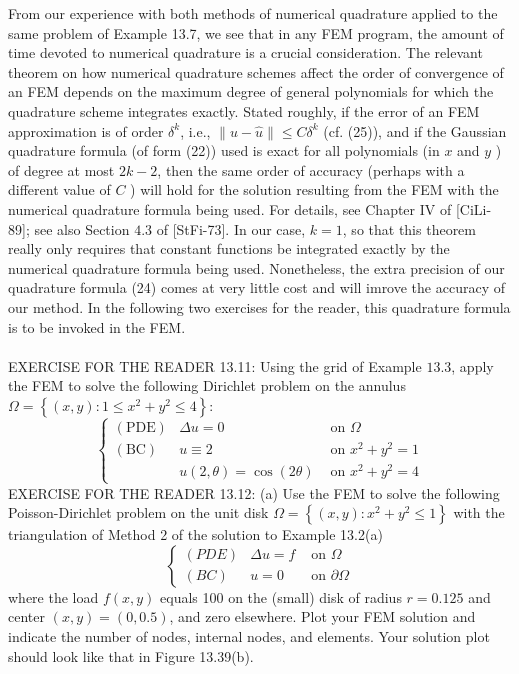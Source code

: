 \documentclass[../main.tex]{subfiles}
\begin{document}
From our experience with both methods of numerical quadrature applied to the same problem of Example 13.7, we see that in any FEM program, the amount of time devoted to numerical quadrature is a crucial consideration. The relevant theorem on how numerical quadrature schemes affect the order of convergence of an FEM depends on the maximum degree of general polynomials for which the quadrature scheme integrates exactly. Stated roughly, if the error of an FEM approximation is of order $\delta^{k}$, i.e., $\|u-\hat{u}\| \leq C \delta^{k}$ (cf. (25)), and if the Gaussian quadrature formula (of form (22)) used is exact for all polynomials (in $x$ and $y$ ) of degree at most $2 k-2$, then the same order of accuracy (perhaps with a different value of $C$ ) will hold for the solution resulting from the FEM with the numerical quadrature formula being used. For details, see Chapter IV of [CiLi-89]; see also Section $4.3$ of [StFi-73]. In our case, $k=1$, so that this theorem really only requires that constant functions be integrated exactly by the numerical quadrature formula being used. Nonetheless, the extra precision of our quadrature formula (24) comes at very little cost and will imrove the accuracy of our method. In the following two exercises for the reader, this quadrature formula is to be invoked in the FEM.
\\
\\
EXERCISE FOR THE READER 13.11: Using the grid of Example $13.3$, apply the FEM to solve the following Dirichlet problem on the annulus $\Omega=\left\{(x, y): 1 \leq x^{2}+y^{2} \leq 4\right\}:$
$$
\left\{\begin{array}{lll}
(\mathrm{PDE}) & \Delta u=0 & \text { on } \Omega \\
(\mathrm{BC}) & u \equiv 2 & \text { on } x^{2}+y^{2}=1 \\
& u(2, \theta)=\cos (2 \theta) & \text { on } x^{2}+y^{2}=4
\end{array}\right.
$$
EXERCISE FOR THE READER 13.12: (a) Use the FEM to solve the following Poisson-Dirichlet problem on the unit disk $\Omega=\left\{(x, y): x^{2}+y^{2} \leq 1\right\}$ with the triangulation of Method 2 of the solution to Example 13.2(a)
$$
\left\{\begin{array}{lll}
(P D E) & \Delta u=f & \text { on } \Omega \\
(B C) & u=0 & \text { on } \partial \Omega
\end{array}\right.
$$
where the load $f(x, y)$ equals 100 on the (small) disk of radius $r=0.125$ and center $(x, y)=(0,0.5)$, and zero elsewhere. Plot your FEM solution and indicate the number of nodes, internal nodes, and elements. Your solution plot should look like that in Figure 13.39(b).
\end{document}
